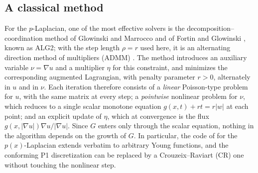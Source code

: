 \documentclass[11pt]{amsart}
\theoremstyle{definition}
\theoremstyle{remark}
\numberwithin{equation}{section}
\newcommand{\abs}[1]{\lvert #1\rvert}
\begin{document}
\subsection*{A classical method}
For the $p$-Laplacian, one of the most effective solvers is the decomposition--coordination method of Glowinski and Marrocco \cite{GlowinskiMarrocco1975} and of Fortin and Glowinski \cite{FortinGlowinski1983,FortinGlowinski1983ChIII,Glowinski1984ChVI}, known as ALG2; with the step length $\rho=r$ used here, it is an alternating direction method of multipliers (ADMM) \cite{GlowinskiPanTai2016,Boyd2011ADMM}. The method introduces an auxiliary variable $\nu=\nabla u$ and a multiplier $\eta$ for this constraint, and minimizes the corresponding augmented Lagrangian, with penalty parameter $r>0$, alternately in $u$ and in $\nu$. Each iteration therefore consists of a \emph{linear} Poisson-type problem for $u$, with the same matrix at every step; a \emph{pointwise} nonlinear problem for $\nu$, which reduces to a single scalar monotone equation $g(x,t)+rt=r\abs w$ at each point; and an explicit update of $\eta$, which at convergence is the flux $g(x,\abs{\nabla u})\nabla u/\abs{\nabla u}$. Since $G$ enters only through the scalar equation, nothing in the algorithm depends on the growth of $G$. In particular, the code of \cite{AragonFBRubio2023} for the $p(x)$-Laplacian extends verbatim to arbitrary Young functions, and the conforming P1 discretization can be replaced by a Crouzeix--Raviart (CR) one without touching the nonlinear step.
\end{document}
